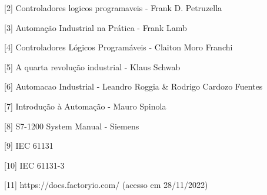 \documentclass[a4paper, 12pt]{article}
\begin{document}
[2] Controladores logicos programaveis - Frank D. Petruzella

[3] Automação Industrial na Prática - Frank Lamb

[4] Controladores Lógicos Programáveis - Claiton Moro Franchi

[5] A quarta revolução industrial - Klaus Schwab

[6] Automacao Industrial - Leandro Roggia \& Rodrigo Cardozo Fuentes

[7] Introdução à Automação - Mauro Spinola

[8] S7-1200 System Manual - Siemens

[9] IEC 61131

[10] IEC 61131-3

[11] https://docs.factoryio.com/ (acesso em 28/11/2022)
\end{document}
